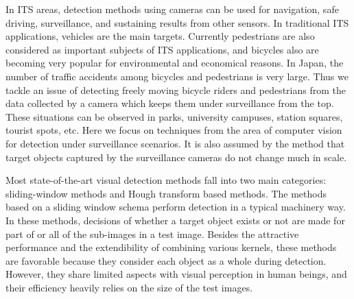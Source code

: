 \documentclass{mva2011}
\begin{document}

 In ITS areas, detection methods using cameras can be used for navigation, safe driving, surveillance, and sustaining results from other sensors. In traditional ITS applications, vehicles are the main targets. Currently pedestrians are also considered as important subjects of ITS applications, and bicycles also are becoming very popular for environmental and economical reasons. In Japan, the number of traffic accidents among bicycles and pedestrians is very large. Thus we tackle an issue of detecting freely moving bicycle riders and pedestrians from the data collected by a camera which keeps them under surveillance from the top. These situations can be observed in parks, university campuses, station squares, tourist spots, etc.  Here we focus on techniques from the area of computer vision for detection under surveillance scenarios. {\color{red}It is also assumed by the method that target objects captured by the surveillance cameras do not change much in scale.}

Most state-of-the-art visual
 detection methods fall into two main categories: sliding-window methods and Hough transform based methods. The methods~\cite{ac4,ac1} based on a sliding window schema perform detection in a typical machinery way. In these methods, decisions of whether a target object exists or not are made for part of or all of the sub-images in a test image. Besides the attractive performance and the extendibility of combining various kernels, these methods are favorable because they consider each object as a whole during detection. However, they share limited aspects with visual perception in human beings, and their efficiency heavily relies on the size of the test images.
\end{document}
